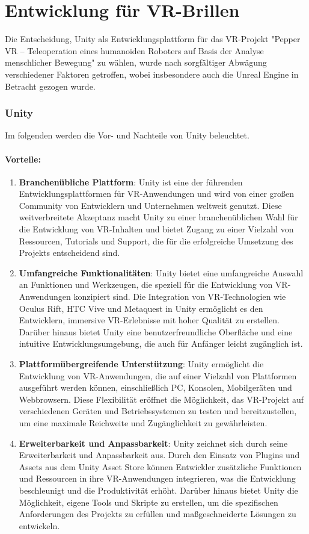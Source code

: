 \section{Entwicklung für VR-Brillen}
Die Entscheidung, Unity als Entwicklungsplattform für das VR-Projekt "Pepper VR – Teleoperation eines humanoiden Roboters auf Basis der Analyse menschlicher Bewegung" zu wählen, wurde nach sorgfältiger Abwägung verschiedener Faktoren getroffen, wobei insbesondere auch die Unreal Engine in Betracht gezogen wurde.

\subsubsection{Unity}
Im folgenden werden die Vor- und Nachteile von Unity beleuchtet.
\paragraph{Vorteile:}

\begin{enumerate}
\item \textbf{Branchenübliche Plattform}: Unity ist eine der führenden Entwicklungsplattformen für VR-Anwendungen und wird von einer großen Community von Entwicklern und Unternehmen weltweit genutzt. Diese weitverbreitete Akzeptanz macht Unity zu einer branchenüblichen Wahl für die Entwicklung von VR-Inhalten und bietet Zugang zu einer Vielzahl von Ressourcen, Tutorials und Support, die für die erfolgreiche Umsetzung des Projekts entscheidend sind.
\item \textbf{Umfangreiche Funktionalitäten}: Unity bietet eine umfangreiche Auswahl an Funktionen und Werkzeugen, die speziell für die Entwicklung von VR-Anwendungen konzipiert sind. Die Integration von VR-Technologien wie Oculus Rift, HTC Vive und Metaquest in Unity ermöglicht es den Entwicklern, immersive VR-Erlebnisse mit hoher Qualität zu erstellen. Darüber hinaus bietet Unity eine benutzerfreundliche Oberfläche und eine intuitive Entwicklungsumgebung, die auch für Anfänger leicht zugänglich ist.

\item \textbf{Plattformübergreifende Unterstützung}: Unity ermöglicht die Entwicklung von VR-Anwendungen, die auf einer Vielzahl von Plattformen ausgeführt werden können, einschließlich PC, Konsolen, Mobilgeräten und Webbrowsern. Diese Flexibilität eröffnet die Möglichkeit, das VR-Projekt auf verschiedenen Geräten und Betriebssystemen zu testen und bereitzustellen, um eine maximale Reichweite und Zugänglichkeit zu gewährleisten.

\item \textbf{Erweiterbarkeit und Anpassbarkeit}: Unity zeichnet sich durch seine Erweiterbarkeit und Anpassbarkeit aus. Durch den Einsatz von Plugins und Assets aus dem Unity Asset Store können Entwickler zusätzliche Funktionen und Ressourcen in ihre VR-Anwendungen integrieren, was die Entwicklung beschleunigt und die Produktivität erhöht. Darüber hinaus bietet Unity die Möglichkeit, eigene Tools und Skripte zu erstellen, um die spezifischen Anforderungen des Projekts zu erfüllen und maßgeschneiderte Lösungen zu entwickeln.
\end{enumerate}

